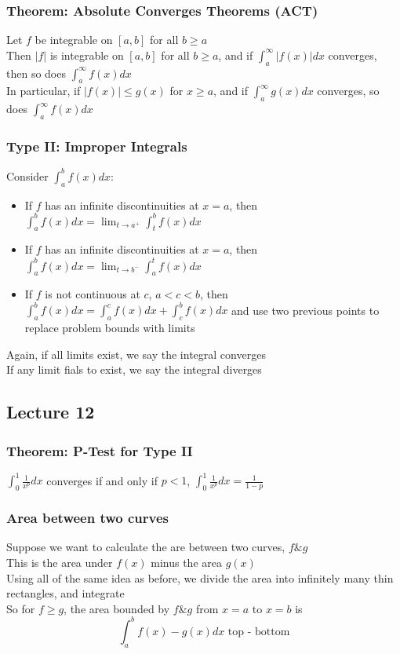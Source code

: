 \documentclass[12pt, letterpaper]{article}
\begin{document}
\subsubsection{Theorem: Absolute Converges Theorems (ACT)}
Let $f$ be integrable on $[a,b]$ for all $b\geq a$ \\
Then $|f|$ is integrable on $[a,b]$ for all $b\geq a$, and if $\displaystyle\int_{a}^{\infty}|f(x)|dx$ converges, then 
so does $\displaystyle\int_{a}^{\infty}f(x)dx$ \\
In particular, if $|f(x)| \leq g(x)$ for $x\geq a$, and if $\displaystyle\int_{a}^{\infty}g(x)dx$ converges, so does $\displaystyle\int_{a}^{\infty}f(x)dx$
\subsubsection{Type II: Improper Integrals}
Consider $\displaystyle\int_{a}^{b}f(x)dx$: 
\begin{itemize}
    \item If $f$ has an infinite discontinuities at $x=a$, then $\displaystyle\int_{a}^{b}f(x)dx = \lim_{t\to a^+}\int_{t}^{b}f(x)dx$
    \item If $f$ has an infinite discontinuities at $x=a$, then $\displaystyle\int_{a}^{b}f(x)dx = \lim_{t\to b^-}\int_{a}^{t}f(x)dx$
    \item If $f$ is not continuous at $c$, $a<c<b$, then $\displaystyle\int_{a}^{b}f(x)dx = \int_{a}^{c}f(x)dx + \int_{c}^{b}f(x)dx$ and use two previous points to replace problem bounds with limits 
\end{itemize}
Again, if all limits exist, we say the integral converges \\
If any limit fials to exist, we say the integral diverges 
\subsection{Lecture 12}
\subsubsection{Theorem: P-Test for Type II}
$\displaystyle\int_{0}^{1}\frac{1}{x^p}dx$ converges if and only if $p<1$, $\displaystyle\int_{0}^{1}\frac{1}{x^p}dx = \frac{1}{1-p}$
\subsubsection{Area between two curves}
Suppose we want to calculate the are between two curves, $f\& g$ \\
This is the area under $f(x)$ minus the area $g(x)$ \\
Using all of the same idea as before, we divide the area into infinitely many thin rectangles, and integrate \\
So for $f\geq g$, the area bounded by $f\&g$ from $x=a$ to $x=b$ is 
\[\int_{a}^{b}f(x)-g(x)dx \text{       top - bottom}\]
\end{document}
